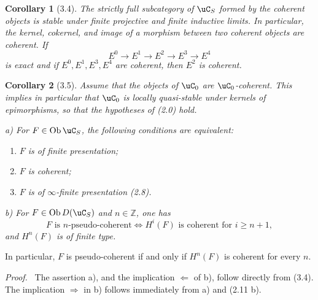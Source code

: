 \documentclass[11pt]{article}
\theoremstyle{plain}
\newtheorem*{corollary*}{Corollary}
\theoremstyle{definition}
\theoremstyle{remark}
\newenvironment{prooftext}{\par\noindent\textit{Proof.}\ }{\par\medskip}
\newcommand{\ZZ}{\mathbb Z}
\DeclareMathOperator{\ob}{Ob}
\begin{document}
\begin{corollary*}[3.4]
The strictly full subcategory of $\uC_S$ formed by the coherent objects is stable under finite projective and finite inductive limits. In particular, the kernel, cokernel, and image of a morphism between two coherent objects are coherent. If
\[
E^0\longrightarrow E^1\longrightarrow E^2\longrightarrow E^3\longrightarrow E^4
\]
is exact and if $E^0,E^1,E^3,E^4$ are coherent, then $E^2$ is coherent.
\end{corollary*}

\begin{corollary*}[3.5]
Assume that the objects of $\uC_0$ are $\uC_0$-coherent. This implies in particular that $\uC_0$ is locally quasi-stable under kernels of epimorphisms, so that the hypotheses of (2.0) hold.

\textup{a)} For $F\in\ob\uC_S$, the following conditions are equivalent:
\begin{enumerate}[label=(\roman*)]
\item $F$ is of finite presentation;
\item $F$ is coherent;
\item $F$ is of $\infty$-finite presentation (2.8).
\end{enumerate}

\textup{b)} For $F\in\ob D(\uC_S)$ and $n\in\ZZ$, one has
\[
F\text{ is }n\text{-pseudo-coherent}
\Longleftrightarrow
H^i(F)\text{ is coherent for }i\geq n+1,
\]
and $H^n(F)$ is of finite type.
\end{corollary*}

In particular, $F$ is pseudo-coherent if and only if $H^n(F)$ is coherent for every $n$.

\begin{prooftext}
The assertion a), and the implication $\Leftarrow$ of b), follow directly from (3.4). The implication $\Rightarrow$ in b) follows immediately from a) and (2.11 b).
\end{prooftext}
\end{document}
